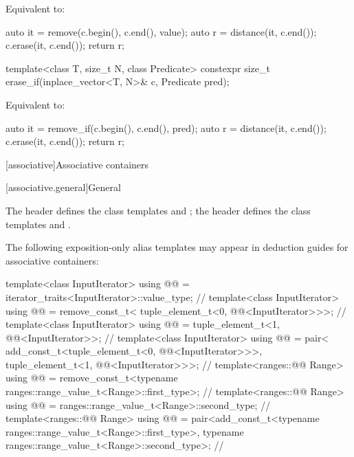 \begin{itemdescr}
\pnum
\effects
Equivalent to:
\begin{codeblock}
auto it = remove(c.begin(), c.end(), value);
auto r = distance(it, c.end());
c.erase(it, c.end());
return r;
\end{codeblock}
\end{itemdescr}

%
\begin{itemdecl}
template<class T, size_t N, class Predicate>
  constexpr size_t erase_if(inplace_vector<T, N>& c, Predicate pred);
\end{itemdecl}

\begin{itemdescr}
\pnum
\effects
Equivalent to:
\begin{codeblock}
auto it = remove_if(c.begin(), c.end(), pred);
auto r = distance(it, c.end());
c.erase(it, c.end());
return r;
\end{codeblock}
\end{itemdescr}

[associative]{Associative containers}

[associative.general]{General}

\pnum
The header  defines the class templates
 and ;
the header  defines the class templates
 and .

\pnum
The following exposition-only alias templates may appear in deduction guides for associative containers:
\begin{codeblock}
template<class InputIterator>
  using @@ = iterator_traits<InputIterator>::value_type;   // \expos
template<class InputIterator>
  using @@ = remove_const_t<
    tuple_element_t<0, @@<InputIterator>>>;                // \expos
template<class InputIterator>
  using @@ =
    tuple_element_t<1, @@<InputIterator>>;                 // \expos
template<class InputIterator>
  using @@ = pair<
    add_const_t<tuple_element_t<0, @@<InputIterator>>>,
    tuple_element_t<1, @@<InputIterator>>>;                // \expos
template<ranges::@@ Range>
  using @@ =
    remove_const_t<typename ranges::range_value_t<Range>::first_type>;  // \expos
template<ranges::@@ Range>
  using @@ = ranges::range_value_t<Range>::second_type; // \expos
template<ranges::@@ Range>
  using @@ =
    pair<add_const_t<typename ranges::range_value_t<Range>::first_type>,
         typename ranges::range_value_t<Range>::second_type>;           // \expos
\end{codeblock}

